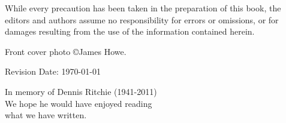 \vspace{0.15cm}

\noindent While every precaution has been taken in the preparation of this
book, the editors and authors assume no responsibility for errors or omissions,
or for damages resulting from the use of the information contained herein.\\

\vspace{0.15cm}

\noindent Front cover photo \copyright James Howe.

\vspace{1cm}

\noindent Revision Date: \today \\

\normalsize

\newpage

\thispagestyle{empty}

\vspace*{5cm}
\begin{center}
\hspace{0cm}In memory of Dennis Ritchie (1941-2011) \\
We hope he would have enjoyed reading \\
what we have written. 
\end{center}

\newpage

\thispagestyle{empty}
\mbox{}    %

